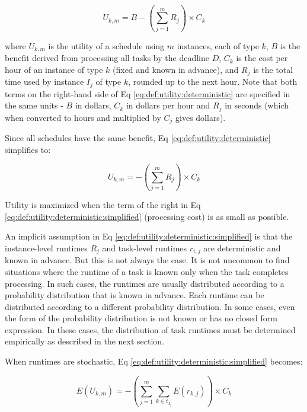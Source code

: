 \documentclass[12pt]{report}
\begin{document}
\begin{equation}
\label{eq:def:utility:deterministic}
	U_{k,m} = B - \left(\sum_{j=1}^{m} R_{j} \right) \times C_k
\end{equation}

where $U_{k,m}$ is the utility of a schedule using $m$ instances, each of type $k$, $B$ is the benefit derived from processing all tasks by the deadline $D$, $C_k$ is the cost per hour of an instance of type $k$ (fixed and known in advance), and $R_j$ is the total time used by instance $I_j$ of type $k$, rounded up to the next hour.
Note that both terms on the right-hand side of Eq \ref{eq:def:utility:deterministic} are specified in the same units - $B$ in dollars, $C_k$ in dollars per hour and $R_j$ in seconds (which when converted to hours and multiplied by $C_j$ gives dollars).

Since all schedules have the same benefit, Eq \ref{eq:def:utility:deterministic} simplifies to:

\begin{equation}
\label{eq:def:utility:deterministic:simplified}
	U_{k,m} = - \left(\sum_{j=1}^{m} R_{j} \right) \times C_k
\end{equation}

Utility is maximized when the term of the right in Eq \ref{eq:def:utility:deterministic:simplified} (processing cost) is as small as possible.

An implicit assumption in Eq \ref{eq:def:utility:deterministic:simplified} is that the instance-level runtimes $R_j$ and task-level runtimes $r_{i,j}$ are deterministic and known in advance.
But this is not always the case.
It is not uncommon to find situations where the runtime of a task is known only when the task completes processing.
In such cases, the runtimes are usually distributed according to a probability distribution that is known in advance.
Each runtime can be distributed according to a different probability distribution.
In some cases, even the form of the probability distribution is not known or has no closed form expression.
In these cases, the distribution of task runtimes must be determined empirically as described in the next section.

When runtimes are stochastic, Eq \ref{eq:def:utility:deterministic:simplified} becomes:

\begin{equation}
\label{eq:def:utility:stochastic}
	E(U_{k,m}) = - \left(\sum_{j=1}^{m} \sum_{k \in t_{I_j}} E(r_{k,j}) \right) \times C_k
\end{equation}
\end{document}
